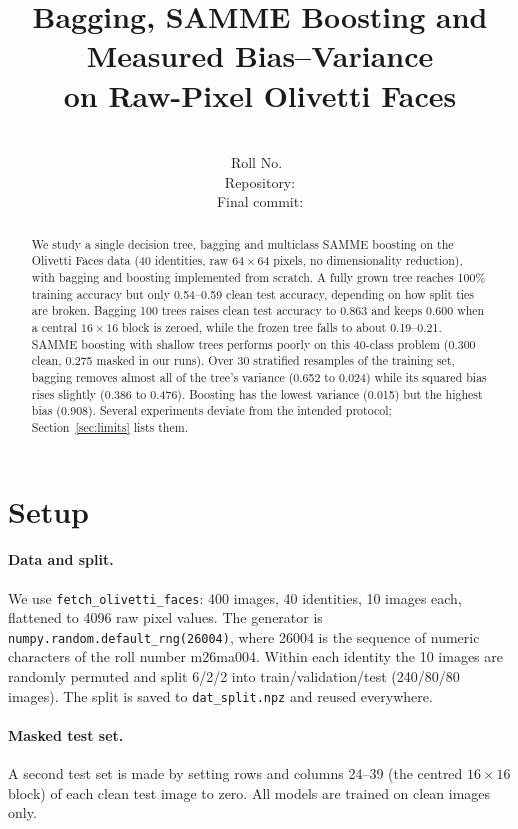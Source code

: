 \documentclass[10pt,twocolumn,letterpaper]{article}
\title{Bagging, SAMME Boosting and Measured Bias--Variance\\ on Raw-Pixel Olivetti Faces}
\author{\studentname\\
Roll No.\ \rollno\\
Repository: \repourl\\
Final commit: \commithash}
\newcommand{\rollno}{m26ma004}          %
\begin{document}
\maketitle

\begin{abstract}
We study a single decision tree, bagging and multiclass SAMME boosting on the Olivetti Faces data (40 identities, raw $64\times64$ pixels, no dimensionality reduction), with bagging and boosting implemented from scratch. A fully grown tree reaches 100\% training accuracy but only 0.54--0.59 clean test accuracy, depending on how split ties are broken. Bagging 100 trees raises clean test accuracy to 0.863 and keeps 0.600 when a central $16\times16$ block is zeroed, while the frozen tree falls to about 0.19--0.21. SAMME boosting with shallow trees performs poorly on this 40-class problem (0.300 clean, 0.275 masked in our runs). Over 30 stratified resamples of the training set, bagging removes almost all of the tree's variance (0.652 to 0.024) while its squared bias rises slightly (0.386 to 0.476). Boosting has the lowest variance (0.015) but the highest bias (0.908). Several experiments deviate from the intended protocol; Section~\ref{sec:limits} lists them.
\end{abstract}

\section{Setup}
\label{sec:setup}

\paragraph{Data and split.}
We use \texttt{fetch\_olivetti\_faces}: 400 images, 40 identities, 10 images each, flattened to 4096 raw pixel values. The generator is \texttt{numpy.random.default\_rng(26004)}, where 26004 is the sequence of numeric characters of the roll number \rollno. Within each identity the 10 images are randomly permuted and split 6/2/2 into train/validation/test (240/80/80 images). The split is saved to \texttt{dat\_split.npz} and reused everywhere.

\paragraph{Masked test set.}
A second test set is made by setting rows and columns 24--39 (the centred $16\times16$ block) of each clean test image to zero. All models are trained on clean images only.
\end{document}
